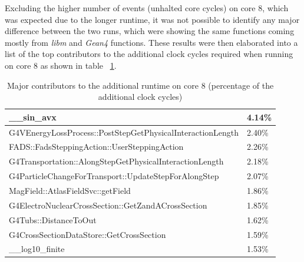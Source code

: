 \documentclass[a4paper]{jpconf}
\begin{document}
Excluding the higher number of events
(unhalted core cycles) on core 8, which was expected due to the longer runtime,
it was not possible to identify any major difference between the two runs, which
were showing the same functions coming mostly from \textit{libm} and \textit{Gean4} 
functions. These results were then elaborated into a list of the top contributors 
to the additional clock cycles required when running on core 8 as shown 
in table ~\ref{major-contributors}.

\begin{table}
\begin{center}
\begin{tabular}{ | l | l |}
    \hline
	\_\_sin\_avx & 4.14\% \\
	\hline
	G4VEnergyLossProcess::PostStepGetPhysicalInteractionLength & 2.40\% \\
    \hline
 	FADS::FadsSteppingAction::UserSteppingAction & 2.26\% \\
    \hline
	G4Transportation::AlongStepGetPhysicalInteractionLength & 2.18\% \\
    \hline
	G4ParticleChangeForTransport::UpdateStepForAlongStep & 2.07\% \\
    \hline
	MagField::AtlasFieldSvc::getField & 1.86\% \\
    \hline
	G4ElectroNuclearCrossSection::GetZandACrossSection	& 1.85\% \\
	\hline
	G4Tubs::DistanceToOut & 1.62\% \\
	\hline
	G4CrossSectionDataStore::GetCrossSection & 1.59\% \\
	\hline
	\_\_log10\_finite &	1.53\% \\
	\hline
\end{tabular}
\end{center}
\caption{Major contributors to the additional runtime on core 8 (percentage
of the additional clock cycles) }
\label{major-contributors}
\end{table}
\end{document}
